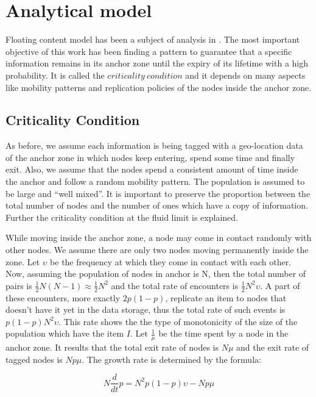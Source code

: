 \section {Analytical model}

Floating content model has been a subject of analysis in
\cite{whendoesdatafloats} . The most important objective of this work has been
finding a pattern to guarantee that a specific information remains in its anchor
zone until the expiry of its lifetime with a high probability. It is called the
$criticality\ condition$ and it depends on many aspects like mobility patterns
and replication policies of the nodes inside the anchor zone. 

\subsection{Criticality Condition}

As before, we assume each information is being tagged with a geo-location
data of the anchor zone in which nodes keep entering, spend some time and
finally exit. Also, we assume that the nodes spend a consistent amount of time
inside the anchor and follow a random mobility pattern. The population is
assumed to be large and ``well mixed''. It is important to preserve the
proportion between the total number of nodes and the number of ones which have
a copy of information. Further the criticality condition at the fluid limit is
explained.

While moving inside the anchor zone, a node may come in contact randomly
with other nodes. We assume there are only two nodes moving permanently inside
the zone. Let $\upsilon$ be the frequency at which they come in contact with
each other. Now, assuming the population of nodes in anchor is N, then the total
number of pairs is $\frac{1}{2}N(N-1) \approx \frac{1}{2}N^2$ and the total rate
of encounters is $\frac{1}{2}N^2\upsilon$. A part of these encounters, more
exactly $2p(1-p)$, replicate an item to nodes that doesn't have it yet in the
data storage, thus the total rate of such events is $p(1-p)N^2\upsilon$. This
rate shows the the type of monotonicity of the size of the population which have
the item $I$. Let $\frac{1}{\mu}$ be the time spent by a node in the anchor
zone. It results that the total exit rate of nodes is $N\mu$ and the exit rate
of tagged nodes is $Np\mu$. The growth rate is determined by the formula:

\begin{equation}
N\frac{d}{dt}p = N^2p(1-p)\upsilon - Np\mu \label{eq:derivative}
\end{equation}

